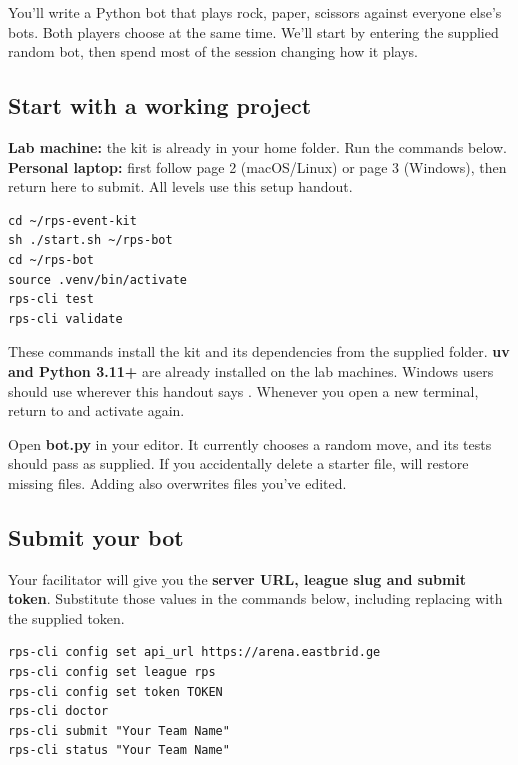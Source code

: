 \documentclass[11pt]{article}
\begin{document}
\thispagestyle{plain}


\begin{context}
You'll write a Python bot that plays rock, paper, scissors against everyone else's bots. Both players choose at the same time. We'll start by entering the supplied random bot, then spend most of the session changing how it plays.

\end{context}

\subsection*{Start with a working project}

\textbf{Lab machine:} the kit is already in your home folder. Run the commands below. \textbf{Personal laptop:} first follow page 2 (macOS/Linux) or page 3 (Windows), then return here to submit. All levels use this setup handout.

\begin{lstlisting}[style=shell]
cd ~/rps-event-kit
sh ./start.sh ~/rps-bot
cd ~/rps-bot
source .venv/bin/activate
rps-cli test
rps-cli validate
\end{lstlisting}

These commands install the kit and its dependencies from the supplied folder. \textbf{uv and Python 3.11+} are already installed on the lab machines. Windows users should use  wherever this handout says . Whenever you open a new terminal, return to  and activate  again.


Open \textbf{bot.py} in your editor. It currently chooses a random move, and its tests should pass as supplied. If you accidentally delete a starter file,  will restore missing files. Adding  also overwrites files you've edited.


\subsection*{Submit your bot}

Your facilitator will give you the \textbf{server URL, league slug and submit token}. Substitute those values in the commands below, including replacing  with the supplied token.


\begin{lstlisting}[style=shell]
rps-cli config set api_url https://arena.eastbrid.ge
rps-cli config set league rps
rps-cli config set token TOKEN
rps-cli doctor
rps-cli submit "Your Team Name"
rps-cli status "Your Team Name"
\end{lstlisting}
\end{document}
